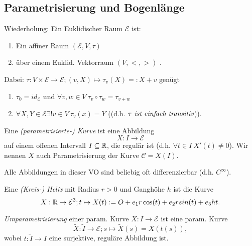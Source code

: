 \subsection{Parametrisierung und Bogenlänge}

Wiederholung: Ein Euklidischer Raum $\mathcal{E}$ ist:
\begin{enumerate}
	\item Ein affiner Raum $(\mathcal{E},V,\tau)$ 
	\item über einem Euklid. Vektorraum $(V,<,>)$ .
\end{enumerate}

	Dabei: $\tau: V\times \mathcal{E} \rightarrow \mathcal{E}; (v,X) \mapsto \tau_v(X)=:X+v$ genügt
	\begin{enumerate}
		\item $\tau_0 = id_{\mathcal{E}}$ und $\forall v,w \in V ~ \tau_v \circ \tau_w = \tau_{v+w}$
		\item $\forall X,Y \in \mathcal{E} \exists! v \in V ~ \tau_v(x) = Y$ ((d.h. $\tau  \emph{ ist einfach transitiv}$)).
	\end{enumerate}
	
	
\begin{definition}
	Eine \emph{(parametrisierte-) Kurve} ist eine Abbildung \[X: I \rightarrow \mathcal{E}\] auf einem offenen Intervall $I \subseteq \mathbb R$, die regulär ist (d.h. $\forall t \in I ~ X'(t) \not = 0$).
	Wir nennen $X$ auch Parametrisierung der Kurve $\mathcal{C} = X(I)$.
\end{definition}

\begin{remark}
	Alle Abbildungen in dieser VO sind beliebig oft differenzierbar (d.h. $C^{\infty}$).
\end{remark}

\begin{example}
	Eine \emph{(Kreis-) Helix} mit Radius $r>0$ und Ganghöhe $h$ ist die Kurve
	\[X: \mathbb R \rightarrow \mathcal{E}^3; t \mapsto X(t) := O + e_1r\cos(t) + e_2rsin(t) + e_3ht. \]
\end{example}

\begin{definition}
	\emph{Umparametrisierung} einer param. Kurve $X: I \rightarrow \mathcal{E}$ ist eine param. Kurve
	\[\widetilde{X}: \widetilde{I} \rightarrow \mathcal{E}; s \mapsto \widetilde{X}(s)=X(t(s)),\]
	wobei $t: \widetilde{I} \rightarrow I$ eine surjektive, reguläre Abbildung ist.

\end{definition}

